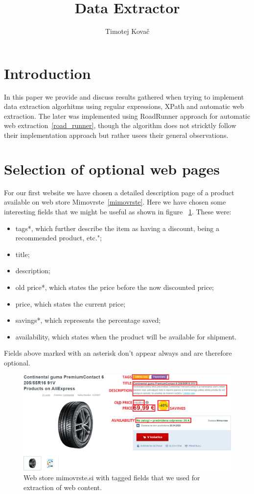 \documentclass[9pt]{IEEEtran}
\title{\vspace{0ex}
Data Extractor}
\author{Timotej Kovač\vspace{-4.0ex}}
\begin{document}
\maketitle

\section{Introduction}

In this paper we provide and discuss results gathered when trying to implement data extraction algorhitms using regular expressions, XPath and automatic web extraction.
The later was implemented using RoadRunner approach for automatic web extraction~\ref{road_runner}, though the algorithm does not stricktly follow their implementation approach but rather usees their general observations.


\section{Selection of optional web pages}

For our first website we have chosen a detailed description page of a product available on web store Mimovrste~\ref{mimovrste}.
Here we have chosen some interesting fields that we might be useful as shown in figure ~\ref{fig_mimovrste}.
These were:
\begin{itemize}
\item{tags*, which further describe the item as having a discount, being a recommended product, etc.";}
\item{title;}
\item{description;}
\item{old price*, which states the price before the now discounted price;}
\item{price, which states the current price;}
\item{savings*, which represents the percentage saved;}
\item{availability, which states when the product will be available for shipment.}
\end{itemize}
Fields above marked with an asterisk don't appear always and are therefore optional.

\begin{figure}[ht]
    \centering
    \includegraphics[width=1\columnwidth]{mimovrste.png}
    \caption{Web store mimovrste.si with tagged fields that we used for extraction of web content.}
    \label{fig_mimovrste}
\end{figure}
\end{document}
